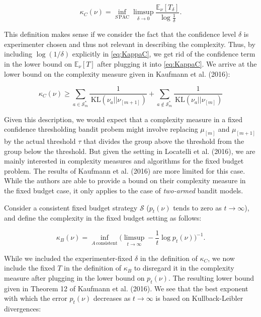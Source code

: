 \documentclass[11pt,]{article}
\newcommand{\KL}{\,\text{KL}}
\begin{document}
\begin{equation}
\kappa_C(\nu) = \inf_{S \, \text{PAC}} \limsup_{\delta \to 0} \frac{\mathbb{E}_{\nu}[T_{\delta}]}{\log \frac{1}{\delta}}. \label{eq:KappaC}
\end{equation}

This definition makes sense if we consider the fact that the confidence
level \(\delta\) is experimenter chosen and thus not relevant in
describing the complexity. Thus, by including \(\log(1/\delta)\)
explicitly in \eqref{eq:KappaC}, we get rid of the confidence term in
the lower bound on \(\mathbb{E}_{\nu}[T]\) after plugging it into
\eqref{eq:KappaC}. We arrive at the lower bound on the complexity
measure given in Kaufmann et al. (2016):

\begin{equation*}
\kappa_C(\nu) \geq \sum_{a \in \mathcal{S}_m^*} \frac{1}{\KL(\nu_a || \nu_{[m+1]})} + \sum_{a \notin \mathcal{S}_m^*} \frac{1}{\KL(\nu_a || \nu_{[m]})}
\end{equation*}

Given this description, we would expect that a complexity measure in a
fixed confidence thresholding bandit probem might involve replacing
\(\mu_{[m]}\) and \(\mu_{[m+1]}\) by the actual threshold \(\tau\) that
divides the group above the threshold from the group below the
threshold. But given the setting in Locatelli et al. (2016), we are
mainly interested in complexity measures and algorithms for the fixed
budget problem. The results of Kaufmann et al. (2016) are more limited
for this case. While the authors are able to provide a bound on their
complexity measure in the fixed budget case, it only applies to the case
of \emph{two-armed} bandit models.

Consider a consistent fixed budget strategy \(\mathcal{S}\)
(\(p_t(\nu)\) tends to zero as \(t \rightarrow \infty\)), and define the
complexity in the fixed budget setting as follows:

\begin{equation}
\kappa_B(\nu) = \inf_{A \, \text{consistent}} \Big(\limsup_{t \to \infty} - \frac{1}{t} \log p_t(\nu)\Big)^{-1}.
\end{equation}

While we included the experimenter-fixed \(\delta\) in the definition of
\(\kappa_C\), we now include the fixed \(T\) in the definition of
\(\kappa_B\) to disregard it in the complexity measure after plugging in
the lower bound on \(p_t(\nu)\). The resulting lower bound given in
Theorem 12 of Kaufmann et al. (2016). We see that the best exponent with
which the error \(p_t(\nu)\) decreases as \(t \rightarrow \infty\) is
based on Kullback-Leibler divergences:
\end{document}
